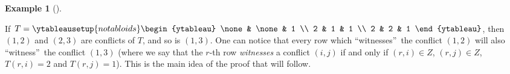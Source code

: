 \documentclass[numbers=enddot,12pt,final,onecolumn,notitlepage]{scrartcl}%
\theoremstyle{definition}
\newtheorem{exmp}[theo]{Example}
\newenvironment{example}[1][]
{\begin{exmp}[#1]\begin{leftbar}}
{\end{leftbar}\end{exmp}}
\begin{document}
\begin{example}
If $T=%
\ytableausetup{notabloids}
\begin{ytableau}
\none& \none& 1 \\
2 & 1 & 1 \\
2 & 2 & 1
\end{ytableau}%
$, then $\left(  1,2\right)  $ and $\left(  2,3\right)  $ are conflicts of
$T$, and so is $\left(  1,3\right)  $. One can notice that every row which
\textquotedblleft witnesses\textquotedblright\ the conflict $\left(
1,2\right)  $ will also \textquotedblleft witness\textquotedblright\ the
conflict $\left(  1,3\right)  $ (where we say that the $r$-th row
\textit{witnesses} a conflict $\left(  i,j\right)  $ if and only if $\left(
r,i\right)  \in Z$, $\left(  r,j\right)  \in Z$, $T\left(  r,i\right)  =2$ and
$T\left(  r,j\right)  =1$). This is the main idea of the proof that will follow.
\end{example}
\end{document}

